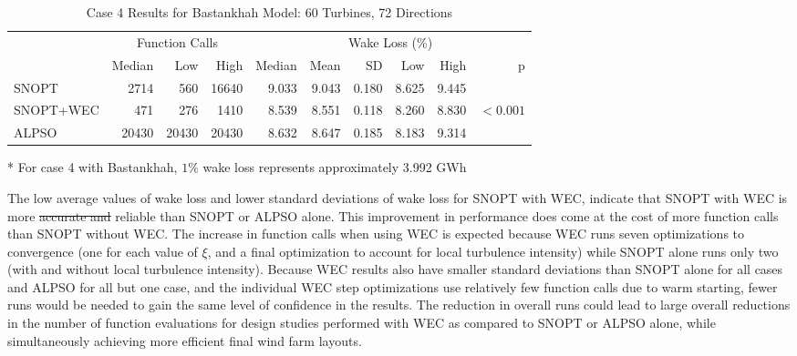 \documentclass[hidelinks,sort&compress,AMA,STIX1COL]{WileyNJD-v2}
\providecommand{\DIFdel}[1]{{\protect\color{red}\sout{#1}}}                      %
\providecommand{\DIFdelbegin}{} %
\providecommand{\DIFdelend}{} %
\newcommand{\DIFscaledelfig}{0.5}
\newlength{\DIFdelgraphicswidth} %
\newlength{\DIFdelgraphicsheight} %
\newcommand{\DIFdelincludegraphics}[2][]{%
\sbox{\DIFdelgraphicsbox}{\DIFOincludegraphics[#1]{#2}}%
\settoboxwidth{\DIFdelgraphicswidth}{\DIFdelgraphicsbox} %
\settoboxtotalheight{\DIFdelgraphicsheight}{\DIFdelgraphicsbox} %
\scalebox{\DIFscaledelfig}{%
\parbox[b]{\DIFdelgraphicswidth}{\usebox{\DIFdelgraphicsbox}\\[-\baselineskip] \rule{\DIFdelgraphicswidth}{0em}}\llap{\resizebox{\DIFdelgraphicswidth}{\DIFdelgraphicsheight}{%
\setlength{\unitlength}{\DIFdelgraphicswidth}%
\begin{picture}(1,1)%
\thicklines\linethickness{2pt} %
{\color[rgb]{1,0,0}\put(0,0){\framebox(1,1){}}}%
{\color[rgb]{1,0,0}\put(0,0){\line( 1,1){1}}}%
{\color[rgb]{1,0,0}\put(0,1){\line(1,-1){1}}}%
\end{picture}%
}\hspace*{3pt}}} %
} %
\DeclareRobustCommand{\DIFdelbegin}{\DIFOdelbegin \let\includegraphics\DIFdelincludegraphics} %
\DeclareRobustCommand{\DIFdelend}{\DIFOaddend \let\includegraphics\DIFOincludegraphics} %
\begin{document}
\begin{table}
	\centering
	\caption{Case 4 Results for Bastankhah Model: 60 Turbines, 72 Directions}
	\label{tab:case4}
	\begin{threeparttable}
	\begin{tabular}{lrrrrrrrrr}
		\toprule
		{} & \multicolumn{3}{c}{Function Calls} & \multicolumn{6}{c}{Wake Loss (\%)\tnote{*}} \\
		\cmidrule(lr){2-4} \cmidrule(lr){5-10}
		{} &         Median &    Low &   High &        Median &  Mean &    SD &   Low &  High &          p \\
		\cmidrule(lr){2-4} \cmidrule(lr){5-10}
		SNOPT     &           2714 &    560 &  16640 &         9.033 & 9.043 & 0.180 & 8.625 & 9.445 &            \\
		SNOPT+WEC &            471 &    276 &   1410 &         8.539 & 8.551 & 0.118 & 8.260 & 8.830 &  $< 0.001$ \\
		ALPSO     &          20430 &  20430 &  20430 &         8.632 & 8.647 & 0.185 & 8.183 & 9.314 &            \\
		\bottomrule
	\end{tabular}
	\begin{tablenotes}
		\item[*] For case 4 with Bastankhah, $1\%$ wake loss represents approximately 3.992 GWh
	\end{tablenotes}
	\end{threeparttable}
\end{table}

The low average values of wake loss and lower standard deviations of wake loss for SNOPT with WEC, indicate that SNOPT with WEC is more \DIFdelbegin \DIFdel{accurate and }\DIFdelend reliable than SNOPT or ALPSO alone. This improvement in performance does come at the cost of more function calls than SNOPT without WEC. The increase in function calls when using WEC is expected because WEC runs seven optimizations to convergence (one for each value of $\xi$, and a final optimization to account for local turbulence intensity) while SNOPT alone runs only two (with and without local turbulence intensity). Because WEC results also have smaller standard deviations than SNOPT alone for all cases and ALPSO for all but one case, and the individual WEC step optimizations use relatively few function calls due to warm starting, fewer runs would be needed to gain the same level of confidence in the results. The reduction in overall runs could lead to large overall reductions in the number of function evaluations for design studies performed with WEC as compared to SNOPT or ALPSO alone, while simultaneously achieving more efficient final wind farm layouts.
\end{document}
